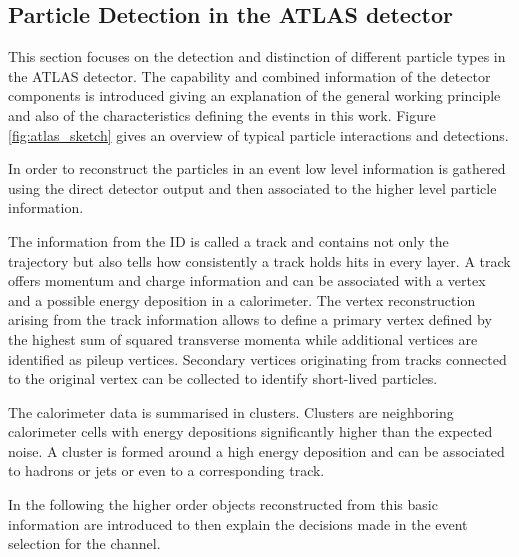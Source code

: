 \subsection{Particle Detection in the ATLAS detector}

This section focuses on the detection and distinction of different particle types in the ATLAS detector. The capability and combined information of the detector components is introduced giving an explanation of the general working principle and also of the characteristics defining the events in this work. Figure \ref{fig:atlas_sketch} gives an overview of typical particle interactions and detections.

In order to reconstruct the particles in an event low level information is gathered using the direct detector output and then associated to the higher level particle information.

The information from the ID is called a track and contains not only the trajectory but also tells how consistently a track holds hits in every layer. A track offers momentum and charge information and can be associated with a vertex and a possible energy deposition in a calorimeter. 
The vertex reconstruction arising from the track information allows to define a primary vertex defined by the highest sum of squared transverse momenta while additional vertices are identified as pileup vertices.
Secondary vertices originating from tracks connected to the original vertex can be collected to identify short-lived particles.

The calorimeter data is summarised in clusters. Clusters are neighboring calorimeter cells with energy depositions significantly higher than the expected noise. A cluster is formed around a high energy deposition and can be associated to hadrons or jets or even to a corresponding track.

In the following the higher order objects reconstructed from this basic information are introduced to then explain the decisions made in the event selection for the \tW channel.

